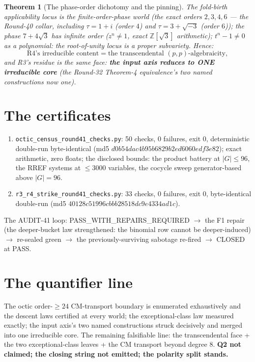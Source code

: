 \documentclass[11pt]{article}
\newtheorem{theorem}{Theorem}
\begin{document}
\begin{theorem}[The phase-order dichotomy and the pinning]
The fold-birth applicability locus is the finite-order-phase world (the
exact orders $2, 3, 4, 6$ --- the Round-40 collar, including $\tau = 1+i$
(order $4$) and $\tau = 3 + \sqrt{-3}$ (order $6$)); the phase
$7 + 4\sqrt{3}$ has infinite order ($z^n \neq 1$, exact
$\mathbb{Z}[\sqrt 3]$ arithmetic); $t^n - 1 \neq 0$ as a polynomial: the
root-of-unity locus is a proper subvariety. Hence:
\[
\text{R4's irreducible content} = \text{the transcendental }(p,p)\text{-algebraicity},
\]
and R3's residue is the same face: \textbf{the input axis reduces to ONE
irreducible core} (the Round-32 Theorem-4 equivalence's two named
constructions now one).
\end{theorem}

\section{The certificates}

\begin{enumerate}
\item \texttt{octic\_census\_round41\_checks.py}: 50 checks, 0 failures,
exit 0, deterministic double-run byte-identical (md5
$d0b54dac4b95b6829b2ed6060edf3e82$); exact arithmetic, zero floats; the
disclosed bounds: the product battery at $|G| \leq 96$, the RREF systems at
$\leq 3000$ variables, the cocycle sweep generator-based above $|G| = 96$.
\item \texttt{r3\_r4\_strike\_round41\_checks.py}: 33 checks, 0 failures,
exit 0, byte-identical double-run (md5 $40128c51996cbbb28518dc9e4334ad1c$).
\end{enumerate}

The AUDIT-41 loop: PASS\_WITH\_REPAIRS\_REQUIRED $\to$ the F1 repair (the
deeper-bucket law strengthened: the binomial row cannot be deeper-induced)
$\to$ re-sealed green $\to$ the previously-surviving sabotage re-fired
$\to$ CLOSED at PASS.

\section*{The quantifier line}

The octic order-$\geq 24$ CM-transport boundary is enumerated exhaustively
and the descent laws certified at every world; the exceptional-class law
measured exactly; the input axis's two named constructions struck decisively
and merged into one irreducible core. The remaining falsifiable line: the
transcendental face + the two exceptional-class leaves + the CM transport
beyond degree 8. \textbf{Q2 not claimed; the closing string not emitted; the
polarity split stands.}
\end{document}
